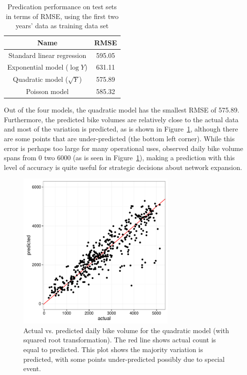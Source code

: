 \documentclass [11pt, proquest] {uwthesis}[2015/03/03]
\begin{document}
\begin{table}
 \centering 
  \label{tbl:pred4model} 
\small
\begin{tabular}{ c | c } 
\hline 
  Name & RMSE \\ 
\hline
  Standard linear regression & 595.05  \\ 
  Exponential model ($\log{Y}$) & 631.11 \\ 
  Quadratic model ($\sqrt{Y}$) & 575.89\\ 
  Poisson model & 585.32 \\
\hline 
\end{tabular} 
\caption{Predication performance on test sets in terms of RMSE, using the first two years' data as training data set} 
\end{table} 


Out of the four models, the quadratic model has the smallest RMSE of 575.89. Furthermore, the predicted bike volumes are relatively close to the actual data and most of the variation is predicted, as is shown in Figure~\ref{fig:avpmodel0}, although there are some points that are under-predicted (the bottom left corner). While this error is perhaps too large for many operational uses, observed daily bike volume spans from 0 two 6000 (as is seen in Figure~\ref{fig:avpmodel0}), making a prediction with this level of accuracy is quite useful for strategic decisions about network expansion.
\begin{figure}
\centering
   \includegraphics[width=0.7\textwidth]{figures/actualvspred} \caption{Actual vs. predicted daily bike volume for the quadratic model (with squared root transformation). The red line shows actual count is equal to predicted. This plot shows the majority variation is predicted, with some points under-predicted possibly due to special event.}
  \label{fig:avpmodel0}
  \vspace{-.5in}
\end{figure}
\end{document}
